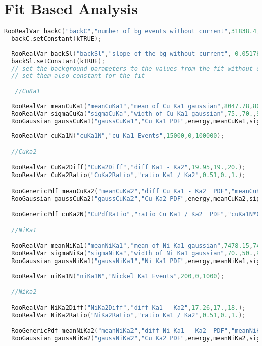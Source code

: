 \begin{appendices}
\begin{lstlisting}[language=Mathematica]
\end{lstlisting}

\section{Fit Based Analysis}

\begin{lstlisting}[language=C++]
  RooRealVar backC("backC","number of bg events without current",31838.4,10000.,50000.);
  backC.setConstant(kTRUE);
 
  RooRealVar backSl("backSl","slope of the bg without current",-0.05176,-1.,1.);
  backSl.setConstant(kTRUE);
  // set the background parameters to the values from the fit without current
  // set them also constant for the fit
  
   //CuKa1
  
  RooRealVar meanCuKa1("meanCuKa1","mean of Cu Ka1 gaussian",8047.78,8040.,8080.);
  RooRealVar sigmaCuKa("sigmaCuKa","width of Cu Ka1 gaussian",75.,70.,90.);
  RooGaussian gaussCuKa1("gaussCuKa1","Cu Ka1 PDF",energy,meanCuKa1,sigmaCuKa);
 
  RooRealVar cuKa1N("cuKa1N","cu Ka1 Events",15000,0,100000);

  //Cuka2

  RooRealVar CuKa2Diff("CuKa2Diff","diff Ka1 - Ka2",19.95,19.,20.);
  RooRealVar CuKa2Ratio("CuKa2Ratio","ratio Ka1 / Ka2",0.51,0.,1.);

  RooGenericPdf meanCuKa2("meanCuKa2","diff Cu Ka1 - Ka2  PDF","meanCuKa1 - CuKa2Diff",RooArgSet(meanCuKa1,CuKa2Diff));
  RooGaussian gaussCuKa2("gaussCuKa2","Cu Ka2 PDF",energy,meanCuKa2,sigmaCuKa); 

  RooGenericPdf cuKa2N("CuPdfRatio","ratio Cu Ka1 / Ka2  PDF","cuKa1N*CuKa2Ratio",RooArgSet(cuKa1N,CuKa2Ratio));

  //NiKa1

  RooRealVar meanNiKa1("meanNiKa1","mean of Ni Ka1 gaussian",7478.15,7470.,7500.);
  RooRealVar sigmaNiKa("sigmaNiKa","width of Ni Ka1 gaussian",70.,50.,90.);
  RooGaussian gaussNiKa1("gaussNiKa1","Ni Ka1 PDF",energy,meanNiKa1,sigmaNiKa); 
 
  RooRealVar niKa1N("niKa1N","Nickel Ka1 Events",200,0,1000);

  //Nika2

  RooRealVar NiKa2Diff("NiKa2Diff","diff Ka1 - Ka2",17.26,17.,18.);
  RooRealVar NiKa2Ratio("NiKa2Ratio","ratio Ka1 / Ka2",0.51,0.,1.);

  RooGenericPdf meanNiKa2("meanNiKa2","diff Ni Ka1 - Ka2  PDF","meanNiKa1 - NiKa2Diff",RooArgSet(meanNiKa1,NiKa2Diff));
  RooGaussian gaussNiKa2("gaussNiKa2","Cu Ka2 PDF",energy,meanNiKa2,sigmaNiKa);


\end{lstlisting}
\end{appendices}
